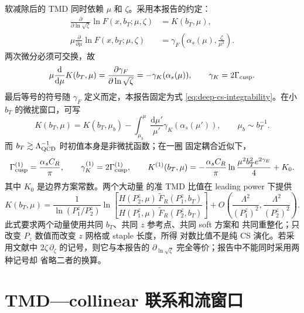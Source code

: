 \documentclass[UTF8,11pt,oneside]{ctexbook}
\newcommand{\dd}{\mathrm{d}}
\begin{document}
软减除后的 TMD 同时依赖 \(\mu\) 和 \(\zeta\)。采用本报告的约定：
\begin{align}
 \frac{\partial}{\partial\ln\sqrt\zeta}\ln F(x,b_T;\mu,\zeta)
 &=K(b_T,\mu),
 \label{eq:deep-cs-equation}\\
 \mu\frac{\partial}{\partial\mu}\ln F(x,b_T;\mu,\zeta)
 &=\gamma_F\left(\alpha_s(\mu),\frac{\zeta}{\mu^2}\right).
 \label{eq:deep-tmd-mu-rge}
\end{align}
两次微分必须可交换，故
\begin{equation}
 \mu\frac{\dd}{\dd\mu}K(b_T,\mu)
 =\frac{\partial\gamma_F}{\partial\ln\sqrt\zeta}
 =-\gamma_K(\alpha_s(\mu)),
 \qquad \gamma_K=2\Gamma_{\rm cusp}.
 \label{eq:deep-cs-integrability}
\end{equation}
最后等号的符号随 \(\gamma_F\) 定义而定，本报告固定为式
\eqref{eq:deep-cs-integrability}。在小 \(b_T\) 的微扰窗口，可写
\begin{equation}
 K(b_T,\mu)=K(b_T,\mu_b)
 -\int_{\mu_b}^{\mu}\frac{\dd\mu'}{\mu'}
 \gamma_K(\alpha_s(\mu')),
 \qquad \mu_b\sim b_T^{-1}.
 \label{eq:deep-cs-solution}
\end{equation}
而 \(b_T\gtrsim\Lambda_{\rm QCD}^{-1}\) 时初值本身是非微扰函数；在一圈
固定耦合近似下，
\begin{equation}
 \Gamma_{\rm cusp}^{(1)}=\frac{\alpha_s C_R}{\pi},
 \qquad \gamma_K^{(1)}=2\Gamma_{\rm cusp}^{(1)},
 \qquad K^{(1)}(b_T,\mu)=-\frac{\alpha_s C_R}{\pi}
 \ln\frac{\mu^2b_T^2e^{2\gamma_E}}4+K_0 .
 \label{eq:deep-cs-one-loop}
\end{equation}
其中 \(K_0\) 是边界方案常数。两个大动量
的准 TMD 比值在 leading power 下提供
\begin{equation}
 K(b_T,\mu)=\frac{1}{\ln(P_1^z/P_2^z)}
 \ln\left[
 \frac{H(P_2^z,\mu)\,\widetilde F_R(P_1^z,b_T)}
 {H(P_1^z,\mu)\,\widetilde F_R(P_2^z,b_T)}
 \right]
 +O\left(\frac{\Lambda^2}{(P_1^z)^2},
 \frac{\Lambda^2}{(P_2^z)^2}\right).
 \label{eq:deep-two-momentum-cs}
\end{equation}
此式要求两个动量使用共同 \(b_T\)、共同 \(z\) 参考点、共同 soft 方案和
共同重整化；只改变 \(P_z\) 数值而改变 \(z\) 网格或 staple 长度，所得
对数比值不是纯 CS 演化。若采用文献中
\(2\zeta\,\partial_\zeta\) 的记号，则它与本报告的
\(\partial_{\ln\sqrt\zeta}\) 完全等价；报告中不能同时采用两种记号却
省略二者的换算。

\section{TMD—collinear 联系和流窗口}
\end{document}
